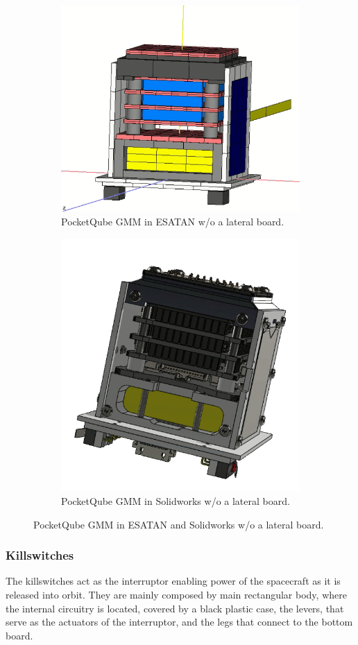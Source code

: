 \begin{figure}[H]
    \centering
    \begin{subfigure}{.5\textwidth}
      \centering
      \includegraphics[width=.6\linewidth]{res/img/5_simulationanalisys/Comparisons/ESATAN/pqnolat.PNG}
      \caption{PocketQube GMM in ESATAN w/o a lateral board.}
      \label{fig:pqnolat}
    \end{subfigure}%
    \begin{subfigure}{.5\textwidth}
      \centering
      \includegraphics[width=.5\linewidth]{res/img/5_simulationanalisys/Comparisons/SLDW/pqnolat_Solid.PNG}
      \caption{PocketQube GMM in Solidworks w/o a lateral board.}
      \label{fig:pqnolatsolid}
    \end{subfigure}
    \caption{PocketQube GMM in ESATAN and Solidworks w/o a lateral board.}
    \label{fig:pqnolatim}
\end{figure}


\subsubsection{Killswitches}
The killswitches act as the interruptor enabling power of the spacecraft as it is released into
orbit. They are mainly composed by main rectangular body, where the internal circuitry is located,
covered by a black plastic case, the levers, that serve as the actuators of the interruptor, and
the legs that connect to the bottom board.

